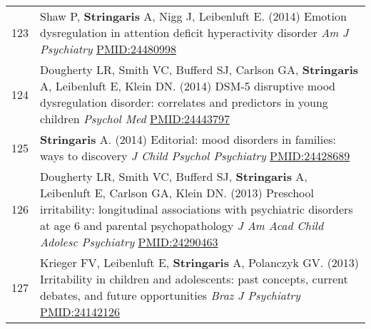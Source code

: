 \documentclass[
]{article}
\begin{document}
\begin{longtable}[]{@{}ll@{}}
\begin{minipage}[t]{0.01\columnwidth}\raggedright
123\strut
\end{minipage} & \begin{minipage}[t]{0.94\columnwidth}\raggedright
Shaw P, \textbf{Stringaris} A, Nigg J, Leibenluft E. (2014) Emotion
dysregulation in attention deficit hyperactivity disorder \emph{Am J
Psychiatry} \url{PMID:24480998}\strut
\end{minipage}\tabularnewline
\begin{minipage}[t]{0.01\columnwidth}\raggedright
124\strut
\end{minipage} & \begin{minipage}[t]{0.94\columnwidth}\raggedright
Dougherty LR, Smith VC, Bufferd SJ, Carlson GA, \textbf{Stringaris} A,
Leibenluft E, Klein DN. (2014) DSM-5 disruptive mood dysregulation
disorder: correlates and predictors in young children \emph{Psychol Med}
\url{PMID:24443797}\strut
\end{minipage}\tabularnewline
\begin{minipage}[t]{0.01\columnwidth}\raggedright
125\strut
\end{minipage} & \begin{minipage}[t]{0.94\columnwidth}\raggedright
\textbf{Stringaris} A. (2014) Editorial: mood disorders in families:
ways to discovery \emph{J Child Psychol Psychiatry}
\url{PMID:24428689}\strut
\end{minipage}\tabularnewline
\begin{minipage}[t]{0.01\columnwidth}\raggedright
126\strut
\end{minipage} & \begin{minipage}[t]{0.94\columnwidth}\raggedright
Dougherty LR, Smith VC, Bufferd SJ, \textbf{Stringaris} A, Leibenluft E,
Carlson GA, Klein DN. (2013) Preschool irritability: longitudinal
associations with psychiatric disorders at age 6 and parental
psychopathology \emph{J Am Acad Child Adolesc Psychiatry}
\url{PMID:24290463}\strut
\end{minipage}\tabularnewline
\begin{minipage}[t]{0.01\columnwidth}\raggedright
127\strut
\end{minipage} & \begin{minipage}[t]{0.94\columnwidth}\raggedright
Krieger FV, Leibenluft E, \textbf{Stringaris} A, Polanczyk GV. (2013)
Irritability in children and adolescents: past concepts, current
debates, and future opportunities \emph{Braz J Psychiatry}
\url{PMID:24142126}\strut
\end{minipage}\tabularnewline

\end{longtable}
\end{document}
